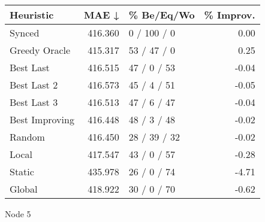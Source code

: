 \begin{tabular}{lrlr}
\toprule
\textbf{Heuristic} & \textbf{MAE ↓} & \textbf{\% Be/Eq/Wo} & \textbf{\% Improv.} \\
\midrule
            Synced &        416.360 &          0 / 100 / 0 &                0.00 \\
     Greedy Oracle &        415.317 &          53 / 47 / 0 &                0.25 \\
         Best Last &        416.515 &          47 / 0 / 53 &               -0.04 \\
       Best Last 2 &        416.573 &          45 / 4 / 51 &               -0.05 \\
       Best Last 3 &        416.513 &          47 / 6 / 47 &               -0.04 \\
    Best Improving &        416.448 &          48 / 3 / 48 &               -0.02 \\
            Random &        416.450 &         28 / 39 / 32 &               -0.02 \\
             Local &        417.547 &          43 / 0 / 57 &               -0.28 \\
            Static &        435.978 &          26 / 0 / 74 &               -4.71 \\
            Global &        418.922 &          30 / 0 / 70 &               -0.62 \\
\bottomrule
\end{tabular}
\caption{Node 5}
\label{tab:non_lr01_le2_bs4_5}
